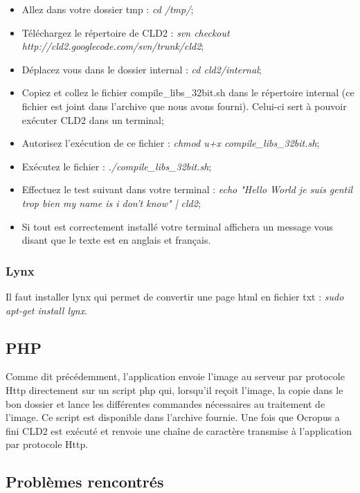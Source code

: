 \begin{itemize}
 \item Allez dans votre dossier tmp : \textit{cd /tmp/};
 \item Téléchargez le répertoire de CLD2 : \textit{svn checkout http://cld2.googlecode.com/svn/trunk/cld2};
 \item Déplacez vous dans le dossier internal : \textit{cd cld2/internal};
 \item Copiez et collez le fichier compile\_libs\_32bit.sh dans le répertoire internal (ce fichier est joint dans l'archive que nous avons fourni). Celui-ci sert à pouvoir exécuter CLD2 dans un terminal;
 \item Autorisez l'exécution de ce fichier : \textit{chmod u+x compile\_libs\_32bit.sh};
 \item Exécutez le fichier : \textit{./compile\_libs\_32bit.sh};
 \item Effectuez le test suivant dans votre terminal : \textit{echo "Hello World je suis gentil trop bien my name is i don't know" | cld2};
 \item Si tout est correctement installé votre terminal affichera un message vous disant que le texte est en anglais et français.
\end{itemize}

\subsubsection{Lynx}

Il faut installer lynx qui permet de convertir une page html en fichier txt : \textit{sudo apt-get install lynx}.

\subsection{PHP}
Comme dit précédemment, l'application envoie l'image au serveur par protocole Http directement sur un script php qui, lorsqu'il reçoit l'image, la copie dans le bon dossier et lance les différentes commandes nécessaires au traitement de l'image. Ce script est disponible dans l'archive fournie. Une fois que Ocropus a fini CLD2 est exécuté et renvoie une chaîne de caractère transmise à l'application par protocole Http.

\subsection{Problèmes rencontrés}

